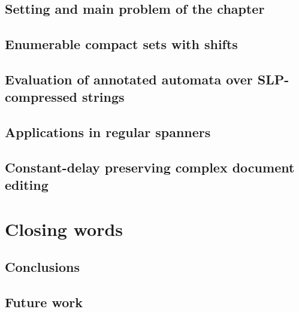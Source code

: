 \documentclass[pdftex]{pucthesis}	%
\begin{document}
\label{slps:sec:introduction}


\section{Setting and main problem of the chapter}\label{slps:sec:setting}



\section{Enumerable compact sets with shifts}\label{slps:sec:ecs}



\section{Evaluation of annotated automata over SLP-compressed strings}\label{slps:sec:evaluation}



\section{Applications in regular spanners}\label{slps:sec:spanners}



\section{Constant-delay preserving complex document editing}\label{slps:sec:edits}







\chapter[CLOSING WORDS]{Closing words}

\section{Conclusions}



\section{Future work}
\end{document}

